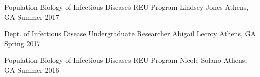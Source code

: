 
\begin{cventries}

    \cventry
    {Population Biology of Infectious Diseases REU Program} %
    {Lindsey Jones} %
    {Athens, GA} %
    {Summer 2017} %
    {
      \begin{cvitems}
      \end{cvitems}
    }

    \cventry
    {Dept. of Infectious Disease Undergraduate Researcher} %
    {Abigail Lecroy} %
    {Athens, GA} %
    {Spring 2017} %
    {
      \begin{cvitems}
      \end{cvitems}
    }

    \cventry
    {Population Biology of Infectious Diseases REU Program} %
    {Nicole Solano} %
    {Athens, GA} %
    {Summer 2016} %
    {
      \begin{cvitems}
      \end{cvitems}
    }

\end{cventries}
